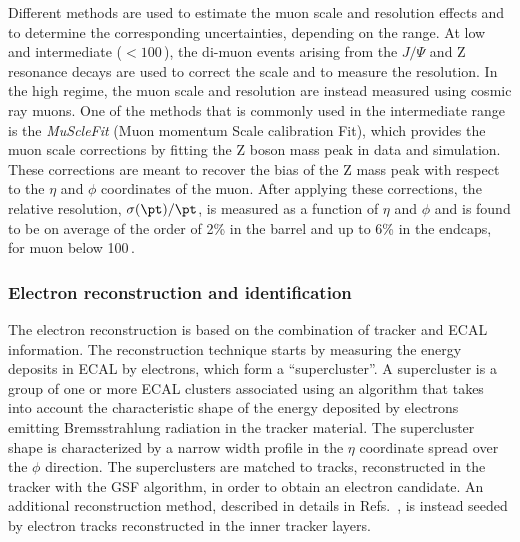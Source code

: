 Different methods are used to estimate the muon \pt scale and resolution effects and to determine the corresponding uncertainties, depending on the \pt range. At low and intermediate \pt ($< 100$\,\GeV), the di-muon events arising from the $J/\Psi$ and Z resonance decays are used to correct the \pt scale and to measure the \pt resolution. In the high \pt regime, the muon \pt scale and resolution are instead measured using cosmic ray muons. One of the methods that is commonly used in the intermediate \pt range is the \emph{MuScleFit} (Muon momentum Scale calibration Fit), which provides the muon \pt scale corrections by fitting the Z boson mass peak in data and simulation. These corrections are meant to recover the bias of the Z mass peak with respect to the $\eta$ and $\phi$ coordinates of the muon. After applying these corrections, the relative \pt resolution, $\sigma(\pt)/\pt$, is measured as a function of $\eta$ and $\phi$ and is found to be on average of the order of 2\% in the barrel and up to 6\% in the endcaps, for muon \pt below 100\,\GeV.

\subsubsection{Electron reconstruction and identification}\label{sec:eleIdIso}

The electron reconstruction is based on the combination of tracker and ECAL information. The reconstruction technique starts by measuring the energy deposits in ECAL by electrons, which form a ``supercluster''. A supercluster is a group of one or more ECAL clusters associated using an algorithm that takes into account the characteristic shape of the energy deposited by electrons emitting Bremsstrahlung radiation in the tracker material. The supercluster shape is characterized by a narrow width profile in the $\eta$ coordinate spread over the $\phi$ direction. The superclusters are matched to tracks, reconstructed in the tracker with the GSF algorithm, in order to obtain an electron candidate. An additional reconstruction method, described in details in Refs.~\cite{CMS-PAS-EGM-10-004,Khachatryan:2015hwa}, is instead seeded by electron tracks reconstructed in the inner tracker layers.

